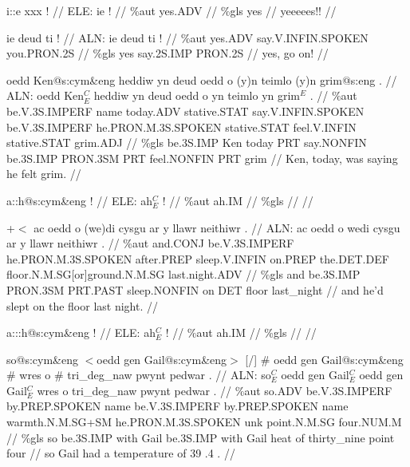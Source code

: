\documentclass[a4paper,10pt]{article}
\begin{document}
\ex
\begingl[lingstyle=gergl]
\glchat i::e xxx ! //
\glsurface ELE:  ie !  //
\glauto \%aut  yes{\scriptsize .ADV}   //
\glmanual \%gls  yes   //
\gleng yeeeees!! //
\endgl
\xe

\ex
\begingl[lingstyle=gergl]
\glchat ie deud ti ! //
\glsurface ALN:  ie deud ti !  //
\glauto \%aut  yes{\scriptsize .ADV} say{\scriptsize .V.INFIN.SPOKEN} you{\scriptsize .PRON.2S}   //
\glmanual \%gls  yes say{\scriptsize .2S.IMP} PRON{\scriptsize .2S}   //
\gleng yes, go on! //
\endgl
\xe

\ex
\begingl[lingstyle=gergl]
\glchat oedd Ken@s:cym\&eng heddiw yn deud oedd o (y)n teimlo (y)n grim@s:eng . //
\glsurface ALN:  oedd Ken$^{C}_{E}$ heddiw yn deud oedd o yn teimlo yn grim$^{E}$ .  //
\glauto \%aut  be{\scriptsize .V.3S.IMPERF} name today{\scriptsize .ADV} stative{\scriptsize .STAT} say{\scriptsize .V.INFIN.SPOKEN} be{\scriptsize .V.3S.IMPERF} he{\scriptsize .PRON.M.3S.SPOKEN} stative{\scriptsize .STAT} feel{\scriptsize .V.INFIN} stative{\scriptsize .STAT} grim{\scriptsize .ADJ}   //
\glmanual \%gls  be{\scriptsize .3S.IMP} Ken today PRT say{\scriptsize .NONFIN} be{\scriptsize .3S.IMP} PRON{\scriptsize .3SM} PRT feel{\scriptsize .NONFIN} PRT grim   //
\gleng Ken, today, was saying he felt grim. //
\endgl
\xe

\ex
\begingl[lingstyle=gergl]
\glchat a::h@s:cym\&eng ! //
\glsurface ELE:  ah$^{C}_{E}$ !  //
\glauto \%aut  ah{\scriptsize .IM}   //
\glmanual \%gls     //
\gleng  //
\endgl
\xe

\ex
\begingl[lingstyle=gergl]
\glchat +$<$ ac oedd o (we)di cysgu ar y llawr neithiwr . //
\glsurface ALN:  ac oedd o wedi cysgu ar y llawr neithiwr .  //
\glauto \%aut  and{\scriptsize .CONJ} be{\scriptsize .V.3S.IMPERF} he{\scriptsize .PRON.M.3S.SPOKEN} after{\scriptsize .PREP} sleep{\scriptsize .V.INFIN} on{\scriptsize .PREP} the{\scriptsize .DET.DEF} floor{\scriptsize .N.M.SG[or]ground.N.M.SG} last{\scriptsize .night.ADV}   //
\glmanual \%gls  and be{\scriptsize .3S.IMP} PRON{\scriptsize .3SM} PRT{\scriptsize .PAST} sleep{\scriptsize .NONFIN} on DET floor last\_night   //
\gleng and he'd slept on the floor last night. //
\endgl
\xe

\ex
\begingl[lingstyle=gergl]
\glchat a:::h@s:cym\&eng ! //
\glsurface ELE:  ah$^{C}_{E}$ !  //
\glauto \%aut  ah{\scriptsize .IM}   //
\glmanual \%gls     //
\gleng  //
\endgl
\xe

\ex
\begingl[lingstyle=gergl]
\glchat so@s:cym\&eng $<$oedd gen Gail@s:cym\&eng$>$ [/] \# oedd gen Gail@s:cym\&eng \# wres o \# tri\_deg\_naw pwynt pedwar . //
\glsurface ALN:  so$^{C}_{E}$ oedd gen Gail$^{C}_{E}$ oedd gen Gail$^{C}_{E}$ wres o tri\_deg\_naw pwynt pedwar .  //
\glauto \%aut  so{\scriptsize .ADV} be{\scriptsize .V.3S.IMPERF} by{\scriptsize .PREP.SPOKEN} name be{\scriptsize .V.3S.IMPERF} by{\scriptsize .PREP.SPOKEN} name warmth{\scriptsize .N.M.SG+SM} he{\scriptsize .PRON.M.3S.SPOKEN} unk point{\scriptsize .N.M.SG} four{\scriptsize .NUM.M}   //
\glmanual \%gls  so be{\scriptsize .3S.IMP} with Gail be{\scriptsize .3S.IMP} with Gail heat of thirty\_nine point four   //
\gleng so Gail had a temperature of 39 .4 . //
\endgl
\xe
\end{document}
